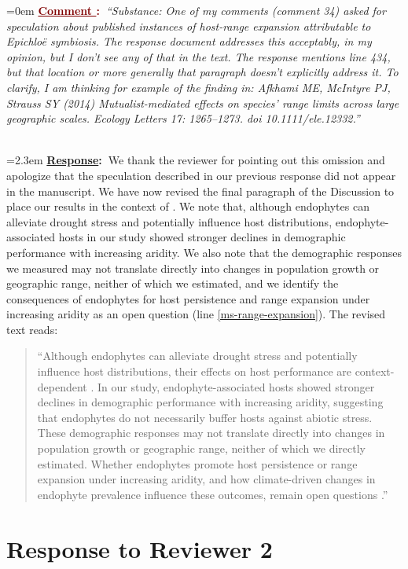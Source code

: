 \documentclass[12pt]{article}
\newcounter{cN}
\newcommand{\comment}[1]{
	\vspace{2em}
	\refstepcounter{cN} %
	\noindent \hangindent=0em \textbf{\textcolor{Maroon}{\uline{Comment \thecN}:~}}\emph{``#1''}
	}
\newcommand{\response}[1]{
	\\[0.25em]
	\hangindent=2.3em \textbf{\textcolor{NavyBlue}{\uline{Response}:~}}#1
	}
\providecommand{\uline}[1]{\underline{#1}}
\begin{document}
\comment{Substance: One of my comments (comment 34) asked for speculation about published instances of host-range expansion attributable to Epichloë symbiosis. The response document addresses this acceptably, in my opinion, but I don't see any of that in the text. The response mentions line 434, but that location or more generally that paragraph doesn't explicitly address it. To clarify, I am thinking for example of the finding in: Afkhami ME, McIntyre PJ, Strauss SY (2014) Mutualist-mediated effects on species' range limits across large geographic scales. Ecology Letters 17: 1265--1273. doi 10.1111/ele.12332.}
\response{We thank the reviewer for pointing out this omission and apologize that the speculation described in our previous response did not appear in the manuscript. We have now revised the final paragraph of the Discussion to place our results in the context of \citet{afkhami2014mutualist}. We note that, although endophytes can alleviate drought stress and potentially influence host distributions, endophyte-associated hosts in our study showed stronger declines in demographic performance with increasing aridity. We also note that the demographic responses we measured may not translate directly into changes in population growth or geographic range, neither of which we estimated, and we identify the consequences of endophytes for host persistence and range expansion under increasing aridity as an open question (line \ref{ms-range-expansion}). The revised text reads:

\begin{quote}
``Although endophytes can alleviate drought stress and potentially influence host distributions, their effects on host performance are context-dependent \citep{afkhami2014mutualist}. In our study, endophyte-associated hosts showed stronger declines in demographic performance with increasing aridity, suggesting that endophytes do not necessarily buffer hosts against abiotic stress. These demographic responses may not translate directly into changes in population growth or geographic range, neither of which we directly estimated. Whether endophytes promote host persistence or range expansion under increasing aridity, and how climate-driven changes in endophyte prevalence influence these outcomes, remain open questions \citep{fowler2025increasing,li2026climate}.''
\end{quote}
}

\section{Response to Reviewer 2}
\vspace{-2em}
\end{document}
